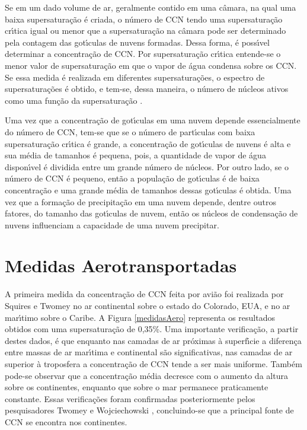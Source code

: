 Se em um dado volume de ar, geralmente contido em uma c\^{a}mara, na qual uma baixa supersatura\c{c}\~{a}o \'{e} criada, o n\'{u}mero de CCN tendo uma supersatura\c{c}\~{a}o cr\'{\i}tica igual ou menor que a supersatura\c{c}\~{a}o na c\^{a}mara pode ser determinado pela contagem das got\'{\i}culas de nuvens formadas. Dessa forma, \'{e} poss\'{\i}vel determinar a concentra\c{c}\~{a}o de CCN. Por supersatura\c{c}\~{a}o cr\'{\i}tica entende-se o menor valor de supersatura\c{c}\~{a}o em que o vapor de \'{a}gua condensa sobre os CCN. Se essa medida \'{e} realizada em diferentes supersatura\c{c}\~{o}es, o espectro de supersatura\c{c}\~{o}es \'{e} obtido, e tem-se, dessa maneira, o n\'{u}mero de n\'{u}cleos ativos como uma fun\c{c}\~{a}o da supersatura\c{c}\~{a}o \cite{Mendes}.

Uma vez que a concentra\c{c}\~{a}o de got\'{\i}culas em uma nuvem depende essencialmente do n\'{u}mero de CCN, tem-se que se o n\'{u}mero de part\'{\i}culas com baixa supersatura\c{c}\~{a}o cr\'{\i}tica \'{e} grande, a concentra\c{c}\~{a}o de got\'{\i}culas de nuvens \'{e} alta e sua m\'{e}dia de tamanhos \'{e} pequena, pois, a quantidade de vapor de \'{a}gua dispon\'{\i}vel \'{e} dividida entre um grande n\'{u}mero de n\'{u}cleos. Por outro lado, se o n\'{u}mero de CCN \'{e} pequeno, ent\~{a}o a popula\c{c}\~{a}o de got\'{\i}culas \'{e} de baixa concentra\c{c}\~{a}o e uma grande m\'{e}dia de tamanhos dessas got\'{\i}culas \'{e} obtida. Uma vez que a forma\c{c}\~{a}o de precipita\c{c}\~{a}o em uma nuvem depende, dentre outros fatores, do tamanho das got\'{\i}culas de nuvem, ent\~{a}o os n\'{u}cleos de condensa\c{c}\~{a}o de nuvens influenciam a capacidade de uma nuvem precipitar.



\section{Medidas Aerotransportadas}
\label{sec:medidasAero}
A primeira medida da concentra\c{c}\~{a}o de CCN feita por avi\~{a}o foi realizada por Squires e Twomey \cite{Squires} no ar continental sobre o estado do Colorado, EUA, e no ar mar\'{\i}timo sobre o Caribe. A Figura \ref{medidasAero} representa os resultados obtidos com uma supersatura\c{c}\~{a}o de 0,35\%. Uma importante verifica\c{c}\~{a}o, a partir destes dados, \'{e} que enquanto nas camadas de ar pr\'{o}ximas \`{a} superf\'{\i}cie a diferen\c{c}a entre massas de ar mar\'{\i}tima e continental s\~{a}o significativas, nas camadas de ar superior \`{a} troposfera a concentra\c{c}\~{a}o de CCN tende a ser mais uniforme. Tamb\'{e}m pode-se observar que a concentra\c{c}\~{a}o m\'{e}dia decresce com o aumento da altura sobre os continentes, enquanto que sobre o mar permanece praticamente constante. Essas verifica\c{c}\~{o}es foram confirmadas posteriormente pelos pesquisadores Twomey e Wojciechowski \cite{Twomey2}, concluindo-se que a principal fonte de CCN se encontra nos continentes.

